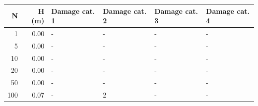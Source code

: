 \begin{tabular}{rrllll}
\toprule
   N &  H (m) & Damage cat. 1 & Damage cat. 2 & Damage cat. 3 & Damage cat. 4 \\
\midrule
   1 &   0.00 &             - &             - &             - &             - \\
   5 &   0.00 &             - &             - &             - &             - \\
  10 &   0.00 &             - &             - &             - &             - \\
  20 &   0.00 &             - &             - &             - &             - \\
  50 &   0.00 &             - &             - &             - &             - \\
 100 &   0.07 &             - &             2 &             - &             - \\
\bottomrule
\end{tabular}
